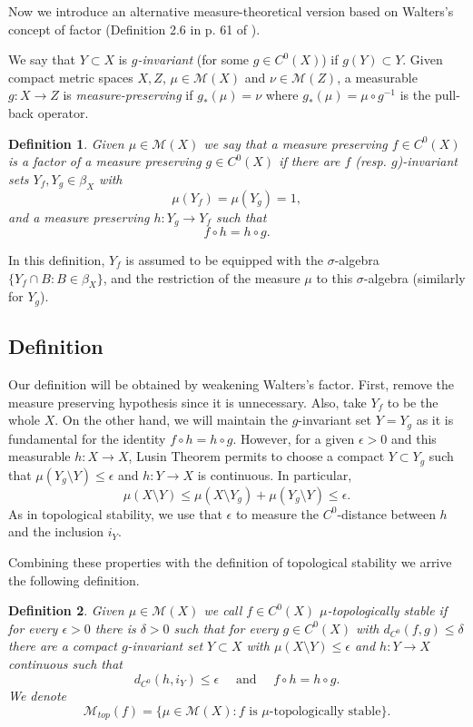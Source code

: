 \documentclass[11pt,letterpaper]{amsart}
\theoremstyle{plain}
\newtheorem{definition}{Definition}
\begin{document}
Now we introduce an alternative measure-theoretical version based on Walters's  concept of factor (Definition 2.6 in p. 61 of  \cite{w2}).

We say that $Y\subset X$ is {\em $g$-invariant} (for some $g\in C^0(X)$) if $g(Y)\subset Y$.
Given compact metric spaces $X, Z$, $\mu\in \mathcal{M}(X)$ and $\nu\in\mathcal{M}(Z)$, a measurable $g:X\to Z$ is {\em measure-preserving} if $g_*(\mu)=\nu$ where
 $g_*(\mu)=\mu\circ g^{-1}$ is the pull-back operator.

\begin{definition}
Given $\mu\in \mathcal{M}(X)$ we say that a measure preserving $f\in C^0(X)$ is a {\em factor} of a measure preserving
$g\in C^0(X)$ if there are $f$ (resp. $g$)-invariant sets $Y_f,Y_g\in \beta_X$ with
$$
\mu(Y_f)=\mu(Y_g)=1,
$$
and a measure preserving $h:Y_g\to Y_f$ such that
$$f\circ h=h\circ g.$$
\end{definition}

In this definition, $Y_f$ is assumed to be equipped with the
$\sigma$-algebra $\{Y_f\cap B:B\in\beta_X\}$, and the restriction of the measure $\mu$ to this $\sigma$-algebra (similarly for $Y_g$).


\subsection{Definition}
Our definition will be obtained
by weakening Walters's factor.
First, remove the measure preserving hypothesis since it is unnecessary.
Also, take $Y_f$ to be the whole $X$.
On the other hand, we will maintain the $g$-invariant set $Y=Y_g$ as it is fundamental for the identity $f\circ h=h\circ g$.
However, for a given $\epsilon>0$ and this measurable $h:X\to X$, Lusin Theorem permits to choose
a compact $Y\subset Y_g$
such that $\mu(Y_g\setminus Y)\leq \epsilon$
and $h:Y\to X$ is continuous. 
In particular,
$$
\mu(X\setminus Y)\leq \mu(X\setminus Y_g)+\mu(Y_g\setminus Y)
\leq \epsilon.
$$
As in topological stability, we use that $\epsilon$ to measure the $C^0$-distance between $h$ and the inclusion $i_Y$. 

Combining these properties with the definition of topological stability we arrive the following definition.

\begin{definition}
Given $\mu\in\mathcal{M}(X)$ we call $f\in C^0(X)$
{\em $\mu$-topologically stable} if for every $\epsilon>0$ there is $\delta>0$ such that for every $g\in C^0(X)$ with $d_{C^0}(f,g)\leq\delta$
 there are a compact $g$-invariant set $Y\subset X$ with
$\mu(X\setminus Y)\leq \epsilon$ and
$h:Y\to X$ continuous such that
$$
d_{C^0}(h,i_Y)\leq \epsilon\quad\mbox{ and }\quad
f\circ h=h\circ g.
$$
We denote
$$
\mathcal{M}_{top}(f)=\{\mu\in\mathcal{M}(X):f\mbox{ is $\mu$-topologically stable}\}.
$$
\end{definition}
\end{document}
